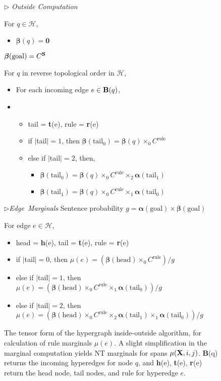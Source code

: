 \documentclass[11pt]{article}
\newcommand{\bS}{{\bf S}}
\newcommand{\bX}{{\bf X}}
\newcommand{\balpha}{\bm{\alpha}}
\newcommand{\bbeta}{\bm{\beta}}
\begin{document}
\begin{figure}[h!]
\begin{footnotesize}
{{				
		$\triangleright$ \emph{Outside Computation}
				
		For $q \in \mathcal{H}$,
		\begin{itemize}[label={},nolistsep]
			\item $\bbeta(q) = \bm{0}$
		\end{itemize}
		$\bbeta(\textrm{goal}) = C^\bS$
		
		For $q$ in reverse topological order in $\mathcal{H}$,
		\begin{itemize}[label={},nolistsep]
			\item For each incoming edge $e \in {\bf B}(q)$,
			\item \begin{itemize}[label={}]
				\item tail = {\bf t}(e), rule = {\bf r}(e)
				\item if $|$tail$| = 1$, then $\bbeta(\textrm{tail}_0) = \bbeta(q) \times_0 C^{\textrm{rule}}$
				\item else if $|$tail$| = 2$, then,
					\begin{itemize}[label={}]
						\item $\bbeta(\textrm{tail}_0) = \bbeta(q) \times_0 C^{\textrm{rule}} \times_2 \balpha(\textrm{tail}_1)$
						\item $\bbeta(\textrm{tail}_1) = \bbeta(q) \times_0 C^{\textrm{rule}} \times_1 \balpha(\textrm{tail}_0)$						
					\end{itemize}

			\end{itemize}
		\end{itemize}
			

		\hbox{$\triangleright$\emph{Edge Marginals}}
		Sentence probability $g = \balpha(\textrm{goal}) \times \bbeta(\textrm{goal})$
		
		For edge $e \in \mathcal{H}$, 
			\begin{itemize}[label={},nolistsep]
					\item head = {\bf h}(e), tail = {\bf t}(e), rule = {\bf r}(e)
					\item if $|$tail$| = 0$, then $\mu(e) = (\bbeta(\textrm{head}) \times_0 C^{\textrm{rule}}) / g$
					\item else if $|$tail$| = 1$, then $\mu(e) = (\bbeta(\textrm{head}) \times_0 C^{\textrm{rule}} \times_1 \balpha(\textrm{tail}_0)) / g$
					\item else if $|$tail$| = 2$, then $\mu(e) = (\bbeta(\textrm{head}) \times_0 C^{\textrm{rule}} \times_2 \balpha(\textrm{tail}_1) \times_1 \balpha(\textrm{tail}_0)) / g$					
			\end{itemize}
}}
\end{footnotesize}
\caption{The tensor form of the hypergraph inside-outside algorithm, for calculation of rule marginals $\mu(e)$.  
A slight simplification in the marginal computation yields NT marginals for spans $\mu(\bX, i, j)$.
{\bf B}(q) returns the incoming hyperedges for node $q$, and {\bf h}(e), {\bf t}(e), {\bf r}(e) return the head node, tail nodes, and rule for hyperedge $e$.} 
\vspace{-0.8cm}
\label{fig:hg_io_spec}
\end{figure}
\end{document}
